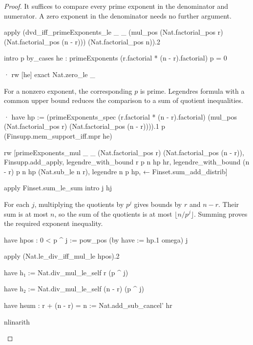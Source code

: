 \begin{proof}
  It suffices to compare every prime exponent in the denominator and numerator.
  A zero exponent in the denominator needs no further argument.

  \begin{lean}
    apply (dvd_iff_primeExponents_le _ _
      (mul_pos (Nat.factorial_pos r) (Nat.factorial_pos (n - r))) (Nat.factorial_pos n)).2

    intro p
    by_cases he : primeExponents (r.factorial * (n - r).factorial) p = 0

    · rw [he]
      exact Nat.zero_le _
  \end{lean}

  For a nonzero exponent, the corresponding $p$ is prime.
  Legendre\textquotesingle s formula with a common upper bound reduces the comparison to a sum of
  quotient inequalities.

  \begin{lean}
    · have hp := (primeExponents_spec (r.factorial * (n - r).factorial)
        (mul_pos (Nat.factorial_pos r) (Nat.factorial_pos (n - r)))).1 p
        (Finsupp.mem_support_iff.mpr he)

      rw [primeExponents_mul _ _ (Nat.factorial_pos r) (Nat.factorial_pos (n - r)),
        Finsupp.add_apply, legendre_with_bound r p n hp hr,
        legendre_with_bound (n - r) p n hp (Nat.sub_le n r), legendre n p hp,
        ← Finset.sum_add_distrib]

      apply Finset.sum_le_sum
      intro j hj
  \end{lean}

  For each $j$, multiplying the quotients by $p^j$ gives bounds by $r$ and $n-r$.
  Their sum is at most $n$, so the sum of the quotients is at most $\lfloor n/p^j\rfloor$.
  Summing proves the required exponent inequality.

  \begin{lean}
    have hpos : 0 < p ^ j := pow_pos (by
        have := hp.1
        omega) j

    apply (Nat.le_div_iff_mul_le hpos).2

    have h₁ := Nat.div_mul_le_self r (p ^ j)

    have h₂ := Nat.div_mul_le_self (n - r) (p ^ j)

    have hsum : r + (n - r) = n := Nat.add_sub_cancel' hr

    nlinarith
  \end{lean}
\end{proof}

